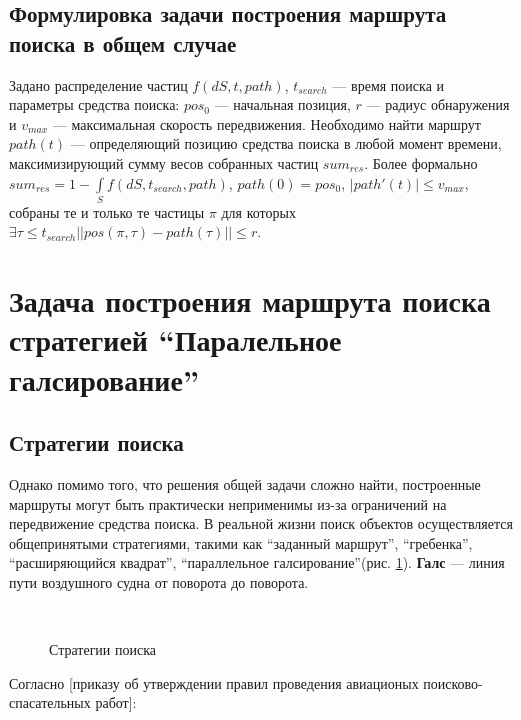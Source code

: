 \FloatBarrier
\subsection{Формулировка задачи построения маршрута поиска 
в общем случае}
Задано распределение частиц $f(dS, t, path)$, $t_{search}$ --- время поиска
и параметры средства поиска: $pos_0$ --- начальная позиция, $r$ --- радиус обнаружения и 
$v_{max}$ --- максимальная скорость передвижения.
 Необходимо найти маршрут $path(t)$ --- определяющий
позицию средства поиска в любой момент времени, максимизирующий сумму весов собранных
частиц $sum_{res}$.
Более формально $sum_{res}=1-\int\limits_Sf(dS, t_{search}, path)$, $path(0)=pos_0$,
 $|path'(t)|\le v_{max}$, собраны те и только те частицы
 $\pi$ для которых $\exists \tau\le t_{search} ||pos(\pi, \tau)-path(\tau)|| \le r$. 
\FloatBarrier
\section{Задача построения маршрута поиска
 стратегией ``Паралельное галсирование''}

\subsection{Стратегии поиска}
Однако помимо того, что решения общей задачи сложно найти, построенные маршруты могут быть
практически неприменимы из-за ограничений на передвижение средства поиска. В реальной жизни
поиск объектов осуществляется общепринятыми стратегиями, такими как ``заданный маршрут'',
``гребенка'', ``расширяющийся квадрат'',
``параллельное галсирование''(рис. \ref{strat:subfigures}).
\textbf{Галс} --- линия пути воздушного судна от поворота до поворота.
\begin{figure}[ht]
  \begin{center}
    \\
  \end{center}
 \caption{Стратегии поиска}
 \label{strat:subfigures}
\end{figure}

Согласно [приказу об утверждении правил проведения авиационых поисково-спасательных работ]:


